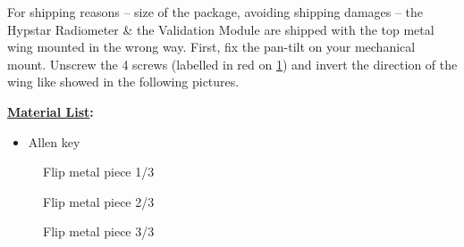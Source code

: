 \vspace{10pt}
\noindent For shipping reasons -- size of the package, avoiding shipping damages -- 
the Hypstar Radiometer \& the Validation Module are shipped with the 
top metal wing mounted in the wrong way. First, fix the pan-tilt on your
mechanical mount. Unscrew the 4 screws (labelled in red on \ref{pic:instrum1})
and invert the direction of the wing like showed in the following pictures.

\vspace{10pt}
\noindent\textbf{\underline{Material List}:}
\begin{itemize}
	\item Allen key
\end{itemize}


\begin{figure}[!ht]
	\centering
	\vspace{-20pt}
	\caption{Flip metal piece 1/3}
	\label{pic:instrum1}
\end{figure}

\begin{figure}[!ht]
	\centering
	\begin{minipage}{.8\textwidth}
		\vspace{-20pt}
		\caption{Flip metal piece 2/3}
		\label{pic:instrum2}
	\end{minipage}

	\vspace{30pt}

	\begin{minipage}{.8\textwidth}
		\vspace{-20pt}
		\caption{Flip metal piece 3/3}
		\label{pic:instrum3}
	\end{minipage}
\end{figure}


